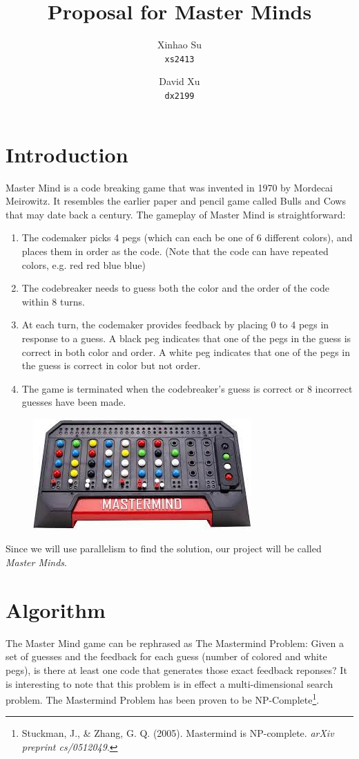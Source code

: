 \documentclass{article}
\title{Proposal for Master Minds}
\author{
	Xinhao Su\\
	\texttt{xs2413}
	\and
	David Xu\\
	\texttt{dx2199}
}
\begin{document}
\maketitle
\section{Introduction}
Master Mind is a code breaking game that was invented in 1970 by Mordecai Meirowitz. 
It resembles the earlier paper and pencil game 
called Bulls and Cows that may date back a century. 
The gameplay of Master Mind is straightforward:
\begin{enumerate}
	\item The codemaker picks 4 pegs (which can each be one of 6 different colors), and places them in order as the code. (Note that the code can have repeated colors, e.g. red red blue blue)
	\item The codebreaker needs to guess both the color and the order of the code within 8 turns. 
	\item At each turn, the codemaker provides feedback by placing 0 to 4 pegs in response to a guess.
	A black peg indicates that one of the pegs in the guess is correct in both color and order. 
	A white peg indicates that one of the pegs in the guess is correct in color but not order. 
	\item The game is terminated when the codebreaker's guess is correct or 8 incorrect guesses have been made.
\end{enumerate}
\begin{figure}[h]
	\centering
	\includegraphics{mm.jpeg}
\end{figure}
Since we will use parallelism to find the solution, our project will be called \textit{Master Minds}.


\pagebreak
\section{Algorithm}

The Master Mind game can be rephrased as The Mastermind Problem: 
Given a set of guesses and the feedback for each guess (number of colored and white pegs), is there at least one code that generates those exact feedback reponses?
It is interesting to note that this problem is in effect a multi-dimensional search problem.
The Mastermind Problem has been proven to be NP-Complete\footnote{Stuckman, J., \& Zhang, G. Q. (2005). Mastermind is NP-complete. \textit{arXiv preprint cs/0512049}.}.
\end{document}
